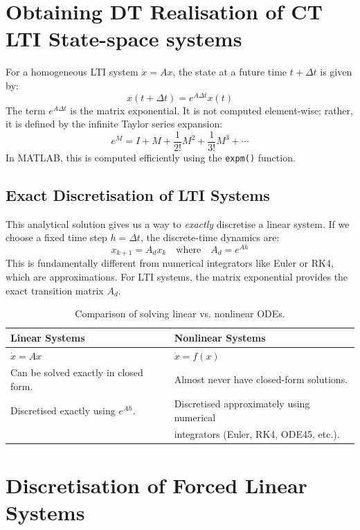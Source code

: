 \section{Obtaining DT Realisation of CT LTI State-space systems}

For a homogeneous LTI system $\dot{{x}} = {A}{x}$, the state at a future time $t+\Delta t$ is given by:
\begin{equation}
	{x}(t+\Delta t) = e^{{A}\Delta t} {x}(t)
\end{equation}
The term $e^{{A}\Delta t}$ is the matrix exponential. It is not computed element-wise; rather, it is defined by the infinite Taylor series expansion:
\[
e^{{M}} = {I} + {M} + \frac{1}{2!}{M}^2 + \frac{1}{3!}{M}^3 + \cdots
\]
In MATLAB, this is computed efficiently using the \texttt{expm()} function.

\subsection{Exact Discretisation of LTI Systems}
This analytical solution gives us a way to \textit{exactly} discretise a linear system. If we choose a fixed time step $h = \Delta t$, the discrete-time dynamics are:
\begin{equation}
	{x}_{k+1} = {A}_d {x}_k \quad \text{where} \quad {A}_d = e^{{A}h}
\end{equation}
This is fundamentally different from numerical integrators like Euler or RK4, which are approximations. For LTI systems, the matrix exponential provides the exact transition matrix ${A}_d$.

\begin{table}[h!]
	\centering
	\begin{tabular}{|l|l|}
		\hline
		\textbf{Linear Systems} & \textbf{Nonlinear Systems} \\
		\hline
		$\dot{{x}} = {A}{x}$ & $\dot{{x}} = {f}({x})$ \\
		Can be solved exactly in closed form. & Almost never have closed-form solutions. \\
		Discretised exactly using $e^{{A}h}$. & Discretised approximately using numerical \\
		& integrators (Euler, RK4, ODE45, etc.). \\
		\hline
	\end{tabular}
	\caption{Comparison of solving linear vs. nonlinear ODEs.}
\end{table}


\section{Discretisation of Forced Linear Systems}

